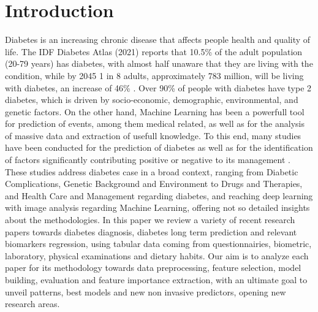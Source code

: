 \documentclass[journal,article,submit,pdftex,moreauthors]{Definitions/mdpi}
\begin{document}
\section{Introduction}
Diabetes is an increasing chronic disease that affects people health and quality of life. The IDF Diabetes Atlas (2021) reports
that 10.5\% of the adult population (20-79 years) has diabetes, with almost half unaware that they are living with the condition,
while by 2045 1 in 8 adults, approximately 783 million, will be living with diabetes, an increase of 46\% \cite{idf}. 
Over 90\% of people with diabetes have type 2 diabetes, which is driven by socio-economic, demographic, environmental, and 
genetic factors. On the other hand, Machine Learning has been a powerfull tool for prediction of events, among them medical 
related, as well as for the analysis of massive data and extraction of usefull knowledge. To this end, many studies have been 
conducted for the prediction of diabetes as well as for the identification of factors significantly contributing positive or negative
to its management \cite{KAVAKIOTIS2017104,Fregoso}. These studies address diabetes case in a broad context, ranging from 
Diabetic Complications, Genetic Background and Environment to Drugs and Therapies, and Health Care and Management regarding diabetes,
and reaching deep learning with image analysis regarding Machine Learning, offering not so detailed insights about the methodologies.
In this paper we review a variety of recent research papers towards diabetes diagnosis, diabetes long term prediction and relevant biomarkers
regression, using tabular data coming from questionnairies, biometric, laboratory, physical examinations and dietary habits. 
Our aim is to analyze each paper for its methodology towards data preprocessing, feature selection, model building, evaluation 
and feature importance extraction, with an ultimate goal to unveil patterns, best models and new non invasive predictors, opening
new research areas. 
 
\end{document}
